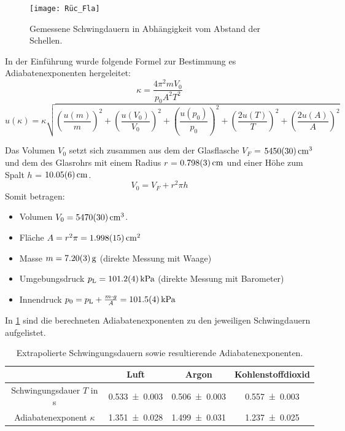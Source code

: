 \documentclass[
	a4paper,
	12pt,
	pagesize,
	ngerman
]{scrartcl}
\begin{document}
	\begin{figure}[H]
		\texttt{[image: Rüc\_Fla]}
		\centering
		\caption{Gemessene Schwingdauern in Abhängigkeit vom Abstand der Schellen.}
		\label{fig_Rüc_Fla}
		\centering
	\end{figure} 

	In der Einführung wurde folgende Formel zur Bestimmung es Adiabatenexponenten hergeleitet:
	\begin{equation}
	\kappa = \frac{4\pi^2mV_0}{p_0 A^2 T^2}
	\label{eq_Rüc_Fla_Kappa}
	\end{equation}
	\begin{equation}
	u(\kappa) = \kappa \sqrt{\left(\frac{u(m)}{m}\right)^2+\left(\frac{u(V_0)}{V_0}\right)^2+\left(\frac{u(p_0)}{p_0}\right)^2+\left(\frac{2u(T)}{T}\right)^2+\left(\frac{2u(A)}{A}\right)^2}
	\end{equation}
	
	Das Volumen $V_0$ setzt sich zusammen aus dem der Glasflasche $V_F$ = $\SI{5450+-30}{cm^3}$ und dem des Glasrohrs mit einem Radius $r$ = $\SI{0,798+-0,003}{cm}$ und einer Höhe zum Spalt $h$ = $\SI{10,05+-0.06}{cm}$.
	\begin{equation}
		V_0 = V_F + r^2 \pi h
	\end{equation}
	Somit betragen:
	\begin{itemize}
		\item Volumen $V_0 = \SI{5470+-30}{cm^3}$.
		\item Fläche $A = r^2\pi = \SI{1,998+-0,015}{cm^2}$
		\item Masse $m = \SI{7,2+-0,03}{g}$ (direkte Messung mit Waage)
		\item Umgebungsdruck $p_\text{L}=\SI{101,2+-0,4}{kPa}$ (direkte Messung mit Barometer)
		\item Innendruck $p_0 = p_\text{L} + \frac{m\cdot g}{A} = \SI{101,5+-0,4}{kPa}$ 
	\end{itemize}
	In \cref{tab_Rüc_Fla} sind die berechneten Adiabatenexponenten zu den jeweiligen Schwingdauern aufgelistet.
	
	\begin{table}[H]
		\centering
		\begin{tabular}{ c | c | c | c}
			&Luft & Argon  & Kohlenstoffdioxid\\ \hline
			Schwingungsdauer $T$ in s&\SI{0,533+-0,003}{}&\SI{0,506+-0,003}{} & \SI{0,557+-0,003}{}\\
			Adiabatenexponent $\kappa$ &\SI{1,351+-0,028}{}&\SI{1,499+-0,031}{}&\SI{1,237+-0,025}{}\\
		\end{tabular}
		\caption{Extrapolierte Schwingungsdauern sowie resultierende Adiabatenexponenten.}
		\label{tab_Rüc_Fla} 
	\end{table}
	
\end{document}
